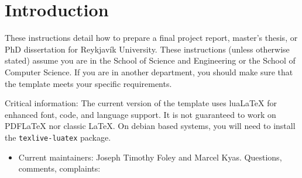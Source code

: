 
\newcommand{\TIheadofgrad}{Slawomir Koziel~\formatemail{slawomir} or TD Person}
\newcommand{\TItvdadmin}{Sigrún Þorgeirsdóttir~\formatemail{sigrunth}}

\section{Introduction} %
These instructions detail how to prepare a final project report, master's thesis, or PhD dissertation for Reykjavík University.
These instructions (unless otherwise stated) assume you are in the School of Science and Engineering or the School of Computer Science.
If you are in another department, you should make sure that the template meets your specific requirements.

Critical information:  The current version of the template uses lua\LaTeX{} for enhanced font, code, and language support.
It is not guaranteed to work on PDF\LaTeX{} nor classic \LaTeX.
On debian based systems, you will need to install the \verb|texlive-luatex| package.

\begin{itemize}
\item Current maintainers: Joseph Timothy Foley and Marcel Kyas.
  Questions, comments, complaints:  

\end{itemize}

